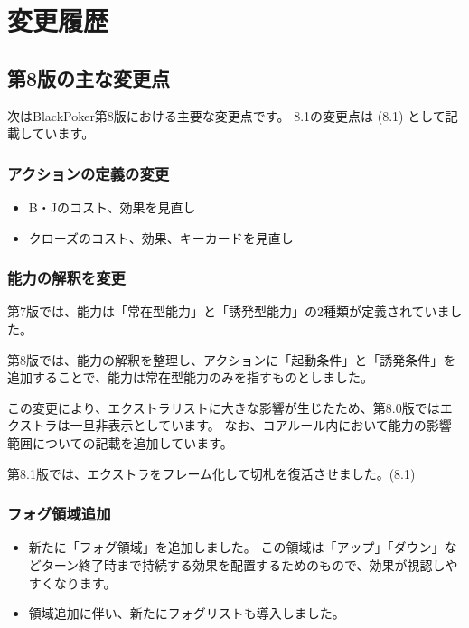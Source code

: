 \documentclass[letterpaper,10pt,dvipdfmx]{sphinxmanual}
\begin{document}
\chapter{変更履歴}
\label{\detokenize{revision-history/revision-history:id1}}\label{\detokenize{revision-history/revision-history::doc}}
\sphinxstepscope


\section{第8版の主な変更点}
\label{\detokenize{revision-history/8th:id1}}\label{\detokenize{revision-history/8th::doc}}
\sphinxAtStartPar
次はBlackPoker第8版における主要な変更点です。
8.1の変更点は (8.1) として記載しています。


\subsection{アクションの定義の変更}
\label{\detokenize{revision-history/8th:id2}}\begin{itemize}
\item {} 
\sphinxAtStartPar
B・Jのコスト、効果を見直し

\item {} 
\sphinxAtStartPar
クローズのコスト、効果、キーカードを見直し

\end{itemize}


\subsection{能力の解釈を変更}
\label{\detokenize{revision-history/8th:id3}}
\sphinxAtStartPar
第7版では、能力は「常在型能力」と「誘発型能力」の2種類が定義されていました。

\sphinxAtStartPar
第8版では、能力の解釈を整理し、アクションに「起動条件」と「誘発条件」を追加することで、能力は常在型能力のみを指すものとしました。

\sphinxAtStartPar
この変更により、エクストラリストに大きな影響が生じたため、第8.0版ではエクストラは一旦非表示としています。 なお、コアルール内において能力の影響範囲についての記載を追加しています。

\sphinxAtStartPar
第8.1版では、エクストラをフレーム化して切札を復活させました。(8.1)


\subsection{フォグ領域追加}
\label{\detokenize{revision-history/8th:id4}}\begin{itemize}
\item {} 
\sphinxAtStartPar
新たに「フォグ領域」を追加しました。
この領域は「アップ」「ダウン」などターン終了時まで持続する効果を配置するためのもので、効果が視認しやすくなります。

\item {} 
\sphinxAtStartPar
領域追加に伴い、新たにフォグリストも導入しました。

\end{itemize}
\end{document}
